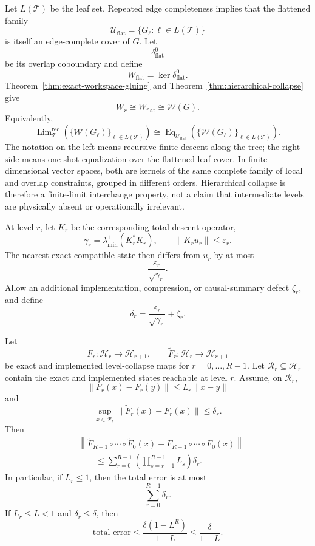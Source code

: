 Let \(L(\mathcal T)\) be the leaf set. Repeated edge completeness implies that
the flattened family
\[
\mathcal U_{\mathrm{flat}}
=
\{G_\ell:\ell\in L(\mathcal T)\}
\]
is itself an edge-complete cover of \(G\). Let
\[
\delta_{\mathrm{flat}}^0
\]
be its overlap coboundary and define
\[
W_{\mathrm{flat}}
=
\ker\delta_{\mathrm{flat}}^0.
\]
Theorem~\ref{thm:exact-workspace-gluing} and
Theorem~\ref{thm:hierarchical-collapse} give
\[
\boxed{
W_r
\cong
W_{\mathrm{flat}}
\cong
\mathscr W(G).
}
\]
Equivalently,
\[
\boxed{
\operatorname{Lim}_{\mathcal T}^{\mathrm{rec}}
\left(
\{\mathscr W(G_\ell)\}_{\ell\in L(\mathcal T)}
\right)
\cong
\operatorname{Eq}_{\mathcal U_{\mathrm{flat}}}
\left(
\{\mathscr W(G_\ell)\}_{\ell\in L(\mathcal T)}
\right).
}
\]
The notation on the left means recursive finite descent along the tree; the
right side means one-shot equalization over the flattened leaf cover. In
finite-dimensional vector spaces, both are kernels of the same complete family
of local and overlap constraints, grouped in different orders. Hierarchical
collapse is therefore a finite-limit interchange property, not a claim that
intermediate levels are physically absent or operationally irrelevant.


At level \(r\), let \(K_r\) be the corresponding total descent operator,
\[
\gamma_r
=
\lambda_{\min}^+(K_r^*K_r),
\qquad
\|K_ru_r\|\leq\varepsilon_r.
\]
The nearest exact compatible state then differs from \(u_r\) by at most
\[
\frac{\varepsilon_r}{\sqrt{\gamma_r}}.
\]
Allow an additional implementation, compression, or causal-summary defect
\(\zeta_r\), and define
\[
\delta_r
=
\frac{\varepsilon_r}{\sqrt{\gamma_r}}
+
\zeta_r.
\]

\begin{theorem}\label{thm:approx-hierarchical-collapse}
Let
\[
F_r:\mathcal H_r\to\mathcal H_{r+1},
\qquad
\widetilde F_r:\mathcal H_r\to\mathcal H_{r+1}
\]
be exact and implemented level-collapse maps for
\(r=0,\ldots,R-1\). Let \(\mathcal R_r\subseteq\mathcal H_r\) contain the exact
and implemented states reachable at level \(r\). Assume, on \(\mathcal R_r\),
\[
\|F_r(x)-F_r(y)\|
\leq
L_r\|x-y\|
\]
and
\[
\sup_{x\in\mathcal R_r}
\|\widetilde F_r(x)-F_r(x)\|
\leq
\delta_r.
\]
Then
\[
\boxed{
\begin{aligned}
&\left\|
\widetilde F_{R-1}\circ\cdots\circ\widetilde F_0(x)
-
F_{R-1}\circ\cdots\circ F_0(x)
\right\|\\
&\qquad\leq
\sum_{r=0}^{R-1}
\left(
\prod_{s=r+1}^{R-1}L_s
\right)
\delta_r.
\end{aligned}
}
\]
In particular, if \(L_r\leq1\), then the total error is at most
\[
\sum_{r=0}^{R-1}\delta_r.
\]
If \(L_r\leq L<1\) and \(\delta_r\leq\delta\), then
\[
\boxed{
\text{total error}
\leq
\frac{\delta(1-L^R)}{1-L}
\leq
\frac{\delta}{1-L}.
}
\]
\end{theorem}

